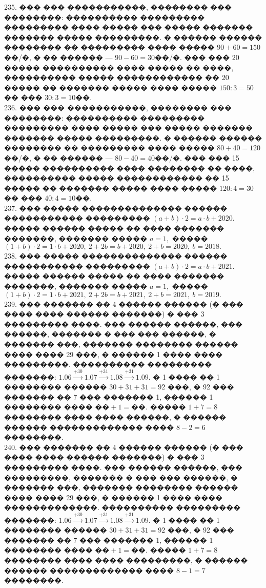\documentclass[12pt]{article}
\begin{document}
235. ��� ��� �����������, �������� ��� ��������: ���������� ��������� ��������� ���� ����� ��� ����� ������� ������� ����� ���������. � ������ ������ �������� �� ��������� ���� ����� $90+60=150$��/�, � �� ������ --- $90-60=30$��/�. ��� ��� 20 ����� ���������� ���� ����� �� ����, ���������� ����� ������������ �� 20 ����� �� ������� ����� ���� ����� $150:3=50$�� ��� $30:3=10$��.\\
236. ��� ��� �����������, �������� ��� ��������: ���������� ��������� ��������� ���� ����� ��� ����� ������� ������� ����� ���������. � ������ ������ �������� �� ��������� ���� ����� $80+40=120$��/�, � �� ������ --- $80-40=40$��/�. ��� ��� 15 ����� ���������� ���� �������� �� ����, ���������� ����� ������������ �� 15 ����� �� ������� ����� ���� ����� $120:4=30$�� ��� $40:4=10$��.\\
237. ��� ����� �������������� ������ ����������� ��������� $(a+b)\cdot2=a\cdot b+2020.$ ����� ������ ����� �� ���� ������� �������, ������� ����� $a=1,$ �����
$(1+b)\cdot 2=1\cdot b+2020,\ 2+2b=b+2020,\ 2+b=2020,\ b=2018.$\\
238. ��� ����� �������������� ������ ����������� ��������� $(a+b)\cdot2=a\cdot b+2021.$ ����� ������ ����� �� ���� ������� �������, ������� ����� $a=1,$ �����
$(1+b)\cdot 2=1\cdot b+2021,\ 2+2b=b+2021,\ 2+b=2021,\ b=2019.$\\
239. ��� ������� �� 4 ������ ������ (� ��� ���� ���� ������ �������) � ��� 3 ��������� ����. ��� ������ ������, ��� ������, ������� � ��� ��� ������, � ������� ���, ������� �������� ������ ���� ���� 29 ���, � ������ 1 ���� ���� ���������. ���������� ��������� �������:
$1.06\stackrel{+30}{\rightarrow}1.07\stackrel{+31}{\rightarrow}1.08\stackrel{+31}{\rightarrow}1.09.$ � 1 ���� �� 1 �������� ������ $30+31+31=92$ ���, � 92 ��� ������� �� 7 ��� ������� 1, ������ 1 �������� ���� $\text{��}+1=\text{��}.$ ����� $1+7=8$ �������� ���� ���� ������, � ������ ������ ������������� ���� $8-2=6$ ��������.\\
240. ��� ������� �� 4 ������ ������ (� ��� ���� ���� ������ �������) � ��� 3 ��������� ����. ��� ������ ������, ��� ���������, ������� � ��� ��� ������, � ������� ���, ������� �������� ������ ���� ���� 29 ���, � ������ 1 ���� ���� �������������. ���������� ��������� �������:
$1.06\stackrel{+30}{\rightarrow}1.07\stackrel{+31}{\rightarrow}1.08\stackrel{+31}{\rightarrow}1.09.$ � 1 ���� �� 1 �������� ������ $30+31+31=92$ ���, � 92 ��� ������� �� 7 ��� ������� 1, ������ 1 �������� ���� $\text{��}+1=\text{��}.$ ����� $1+7=8$ �������� ���� ���� ���������, � ������ ������ ������������� ���� $8-1=7$ ��������.\\
\end{document}
